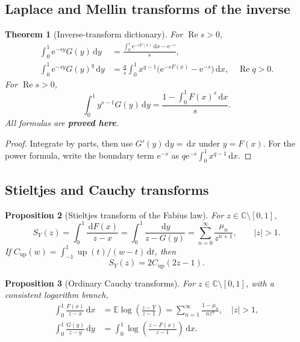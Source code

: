 \documentclass[11pt]{article}
\newcommand{\statusproved}{\textcolor{statusgreen}{\textbf{proved here}}}
\newtheorem{theorem}{Theorem}[section]
\newtheorem{proposition}[theorem]{Proposition}
\theoremstyle{definition}
\theoremstyle{remark}
\newcommand{\C}{\mathbb C}
\newcommand{\E}{\mathbb E}
\newcommand{\dd}{\,\mathrm d}
\newcommand{\e}{\mathrm e}
\newcommand{\Up}{\operatorname{up}}
\newcommand{\Ree}{\operatorname{Re}}
\begin{document}
\subsection{Laplace and Mellin transforms of the inverse}

\begin{theorem}[Inverse-transform dictionary]
\label{thm:inverse-transform-dictionary}
For $\Ree s>0$,
\begin{align}
 \int_0^1\e^{-sy}G(y)\dd y
 &=\frac{\displaystyle\int_0^1\e^{-sF(x)}\dd x-\e^{-s}}s,
 \label{eq:inverse-Laplace}\\
 \int_0^1\e^{-sy}G(y)^q\dd y
 &=\frac q s\int_0^1x^{q-1}
 \bigl(\e^{-sF(x)}-\e^{-s}\bigr)\dd x,
 \quad \Ree q>0.\label{eq:inverse-power-Laplace}
\end{align}
For $\Ree s>0$,
\begin{equation}
 \int_0^1y^{s-1}G(y)\dd y
 =\frac{1-\displaystyle\int_0^1F(x)^s\dd x}{s}.
 \label{eq:inverse-Mellin}
\end{equation}
All formulas are \statusproved.
\end{theorem}

\begin{proof}
Integrate by parts, then use $G'(y)\dd y=\dd x$ under $y=F(x)$.  For the power formula,
write the boundary term $\e^{-s}$ as
$q\e^{-s}\int_0^1x^{q-1}\dd x$.
\end{proof}

\subsection{Stieltjes and Cauchy transforms}

\begin{proposition}[Stieltjes transform of the Fabius law]
\label{prop:Stieltjes}
For $z\in\C\setminus[0,1]$,
\begin{equation}
 S_Y(z)=\int_0^1\frac{\dd F(x)}{z-x}
 =\int_0^1\frac{\dd y}{z-G(y)}
 =\sum_{n=0}^{\infty}\frac{\mu_n}{z^{n+1}},\qquad |z|>1.
 \label{eq:Stieltjes-Y}
\end{equation}
If
$C_{\Up}(w)=\int_{-1}^{1}\Up(t)/(w-t)\dd t$, then
\begin{equation}
 S_Y(z)=2C_{\Up}(2z-1).
 \label{eq:Stieltjes-up}
\end{equation}
\end{proposition}

\begin{proposition}[Ordinary Cauchy transforms]
\label{prop:ordinary-Cauchy}
For $z\in\C\setminus[0,1]$, with a consistent logarithm branch,
\begin{align}
 \int_0^1\frac{F(x)}{z-x}\dd x
 &=\E\log\!\left(\frac{z-Y}{z-1}\right)
 =\sum_{n=1}^{\infty}\frac{1-\mu_n}{nz^n},\quad |z|>1,
 \label{eq:Cauchy-F}\\
 \int_0^1\frac{G(y)}{z-y}\dd y
 &=\int_0^1\log\!\left(\frac{z-F(x)}{z-1}\right)\dd x.
 \label{eq:Cauchy-G}
\end{align}
\end{proposition}
\end{document}
